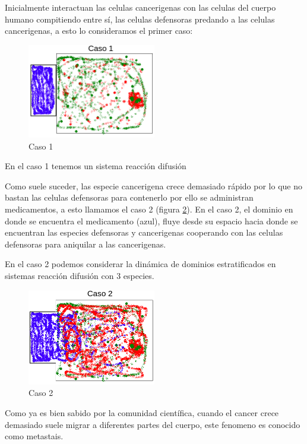 \documentclass{article}
\begin{document}
Inicialmente interactuan las celulas cancerigenas con las celulas del cuerpo humano compitiendo entre sí, las celulas defensoras predando a las celulas cancerigenas, a esto lo consideramos el primer caso:
\begin{figure}[ht]
    \centering
    \includegraphics[width=0.5\textwidth]{images/caso1.png}
    \caption{Caso 1}
    \label{fig:case_1}
\end{figure}
En el caso 1 tenemos un sistema reacción difusión

Como suele suceder, las especie cancerigena crece demasiado rápido por lo que no bastan las celulas defensoras para contenerlo por ello se administran medicamentos, a esto llamamos el caso 2 (figura \ref{fig:case_2}).
En el caso 2, el dominio en donde se encuentra el medicamento (azul), fluye desde su espacio hacia donde se encuentran las especies defensoras y cancerigenas cooperando con las celulas defensoras para aniquilar a las cancerigenas.

En el caso 2 podemos considerar la dinámica de dominios estratificados en sistemas reacción difusión con 3 especies.

\begin{figure}[ht]
    \centering
    \includegraphics[width=0.5\textwidth]{images/caso2.png}
    \caption{Caso 2}
    \label{fig:case_2}
\end{figure}


Como ya es bien sabido por la comunidad científica, cuando el cancer crece demasiado suele migrar a diferentes partes del cuerpo, este fenomeno es conocido como metastais.
\end{document}
